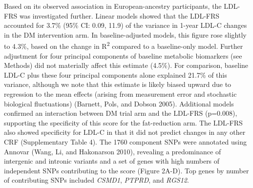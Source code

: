 \documentclass[]{article}
\begin{document}
Based on its observed association in European-ancestry participants, the
LDL-FRS was investigated further. Linear models showed that the LDL-FRS
accounted for 3.7\% (95\% CI: 0.09, 11.9) of the variance in 1-year
LDL-C changes in the DM intervention arm. In baseline-adjusted models,
this figure rose slightly to 4.3\%, based on the change in
R\textsuperscript{2} compared to a baseline-only model. Further
adjustment for four principal components of baseline metabolic
biomarkers (see Methods) did not materially affect this estimate
(4.5\%). For comparison, baseline LDL-C plus these four principal
components alone explained 21.7\% of this variance, although we note
that this estimate is likely biased upward due to regression to the mean
effects (arising from measurement error and stochastic biological
fluctuations) (Barnett, Pols, and Dobson 2005). Additional models
confirmed an interaction between DM trial arm and the LDL-FRS (p=0.008),
supporting the specificity of this score for the fat-reduction arm. The
LDL-FRS also showed specificity for LDL-C in that it did not predict
changes in any other CRF (Supplementary Table 4). The 1760 component
SNPs were annotated using Annovar (Wang, Li, and Hakonarson 2010),
revealing a predominance of intergenic and intronic variants and a set
of genes with high numbers of independent SNPs contributing to the score
(Figure 2A-D). Top genes by number of contributing SNPs included
\emph{CSMD1}, \emph{PTPRD}, and \emph{RGS12}.
\end{document}
